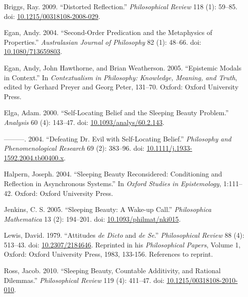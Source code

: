 \documentclass[
  11pt,
  letterpaper,
  DIV=11,
  numbers=noendperiod,
  twoside]{scrartcl}
\newlength{\cslhangindent}
\newenvironment{CSLReferences}[2] %
 {\begin{list}{}{%
  \setlength{\itemindent}{0pt}
  \setlength{\leftmargin}{0pt}
  \setlength{\parsep}{0pt}
  \ifodd #1
   \setlength{\leftmargin}{\cslhangindent}
   \setlength{\itemindent}{-1\cslhangindent}
  \fi
  \setlength{\itemsep}{#2\baselineskip}}}
 {\end{list}}
\begin{document}
\label{refs}
\begin{CSLReferences}{1}{0}
Briggs, Ray. 2009. {``Distorted Reflection.''} \emph{Philosophical
Review} 118 (1): 59--85. doi:
\href{https://doi.org/10.1215/00318108-2008-029}{10.1215/00318108-2008-029}.

Egan, Andy. 2004. {``Second-Order Predication and the Metaphysics of
Properties.''} \emph{Australasian Journal of Philosophy} 82 (1): 48--66.
doi: \href{https://doi.org/10.1080/713659803}{10.1080/713659803}.

Egan, Andy, John Hawthorne, and Brian Weatherson. 2005. {``{Epistemic
Modals in Context}.''} In \emph{Contextualism in Philosophy: Knowledge,
Meaning, and Truth}, edited by Gerhard Preyer and Georg Peter, 131--70.
Oxford: Oxford University Press.

Elga, Adam. 2000. {``Self-Locating Belief and the Sleeping Beauty
Problem.''} \emph{Analysis} 60 (4): 143--47. doi:
\href{https://doi.org/10.1093/analys/60.2.143}{10.1093/analys/60.2.143}.

---------. 2004. {``Defeating Dr. Evil with Self-Locating Belief.''}
\emph{Philosophy and Phenomenological Research} 69 (2): 383--96. doi:
\href{https://doi.org/10.1111/j.1933-1592.2004.tb00400.x}{10.1111/j.1933-1592.2004.tb00400.x}.

Halpern, Joseph. 2004. {``Sleeping Beauty Reconsidered: Conditioning and
Reflection in Asynchronous Systems.''} In \emph{Oxford Studies in
Epistemology}, 1:111--42. Oxford: Oxford University Press.

Jenkins, C. S. 2005. {``Sleeping Beauty: A Wake-up Call.''}
\emph{Philosophica Mathematica} 13 (2): 194--201. doi:
\href{https://doi.org/10.1093/philmat/nki015}{10.1093/philmat/nki015}.

Lewis, David. 1979. {``Attitudes \emph{de Dicto} and \emph{de Se}.''}
\emph{Philosophical Review} 88 (4): 513--43. doi:
\href{https://doi.org/10.2307/2184646}{10.2307/2184646}. Reprinted in
his \emph{Philosophical Papers}, Volume 1, Oxford: Oxford University
Press, 1983, 133-156. References to reprint.

Ross, Jacob. 2010. {``Sleeping Beauty, Countable Additivity, and
Rational Dilemmas.''} \emph{Philosophical Review} 119 (4): 411--47. doi:
\href{https://doi.org/10.1215/00318108-2010-010}{10.1215/00318108-2010-010}.


\end{CSLReferences}
\end{document}
